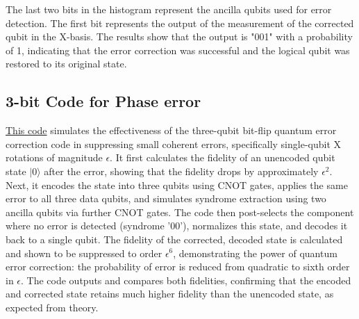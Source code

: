 \documentclass[conference]{IEEEtran}
\begin{document}
The last two bits in the histogram represent the ancilla qubits used for error detection. The first bit represents the output of the measurement of the corrected qubit in the X-basis. The results show that the output is "001" with a probability of 1, indicating that the error correction was successful and the logical qubit was restored to its original state. 

\subsection{3-bit Code for Phase error}
\href{https://github.com/jaymehta132/QuantumErrorCorrection-EE7001/blob/main/Codes/scripts/3bitPhaseEC.py}{This code} simulates the effectiveness of the three-qubit bit-flip quantum error correction code in suppressing small coherent errors, specifically single-qubit X rotations of magnitude $\epsilon$. It first calculates the fidelity of an unencoded qubit state $|0\rangle$ after the error, showing that the fidelity drops by approximately $\epsilon^2$. Next, it encodes the state into three qubits using CNOT gates, applies the same error to all three data qubits, and simulates syndrome extraction using two ancilla qubits via further CNOT gates. The code then post-selects the component where no error is detected (syndrome '00'), normalizes this state, and decodes it back to a single qubit. The fidelity of the corrected, decoded state is calculated and shown to be suppressed to order $\epsilon^6$, demonstrating the power of quantum error correction: the probability of error is reduced from quadratic to sixth order in $\epsilon$. The code outputs and compares both fidelities, confirming that the encoded and corrected state retains much higher fidelity than the unencoded state, as expected from theory.
\end{document}
